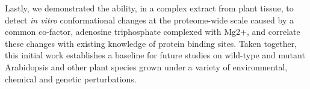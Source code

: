 Lastly, we demonstrated the ability, in a complex extract from plant tissue,
to detect \textit{in vitro} conformational changes at the proteome-wide scale
caused by a common co-factor, adenosine triphosphate complexed with Mg2+, and
correlate these changes with existing knowledge of protein binding sites.
Taken together, this initial work establishes a baseline for future studies on
wild-type and mutant Arabidopsis and other plant species grown under a variety
of environmental, chemical and genetic perturbations.
